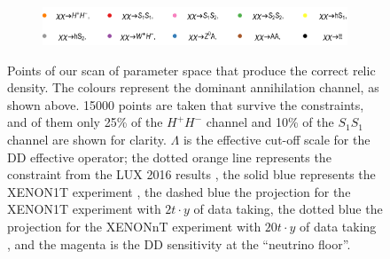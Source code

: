 \begin{figure}[ht]
\begin{subfigure}[t]{0.45\textwidth}
\label{fig:scan1f}
\end{subfigure}
\begin{subfigure}[t]{0.9\textwidth}
\includegraphics[width=\textwidth]{texinputs/05_relic/figures/relic_scalar/LegendH2.pdf}
\end{subfigure}
\caption{Points of our scan of parameter space that produce the correct relic density. The colours represent the dominant annihilation channel, as shown above. 15000 points are taken that survive the constraints, and of them only 25\% of the $H^+H^-$ channel and 10\% of the $S_1S_1$ channel are shown for clarity. $\Lambda$ is the effective cut-off scale for the DD effective operator; the dotted orange line represents the constraint from the LUX 2016 results \citep{Akerib:2016vxi}, the solid blue represents the XENON1T experiment \citep{Aprile:2017iyp}, the dashed blue the projection for the XENON1T experiment with $2t\cdot y$ of data taking, the dotted blue the projection for the XENONnT experiment with $20t\cdot y$ of data taking \citep{Aprile:2015uzo}, and the magenta is the DD sensitivity at the ``neutrino floor''\citep{Billard:2013qya}.}
\label{fig:scan11}
\end{figure}

